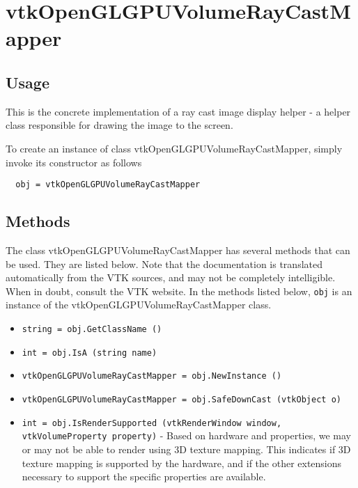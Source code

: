 \section{vtkOpenGLGPUVolumeRayCastMapper}

\subsection{Usage}

 This is the concrete implementation of a ray cast image display helper -
 a helper class responsible for drawing the image to the screen.

To create an instance of class vtkOpenGLGPUVolumeRayCastMapper, simply
invoke its constructor as follows
\begin{verbatim}
  obj = vtkOpenGLGPUVolumeRayCastMapper
\end{verbatim}
\subsection{Methods}

The class vtkOpenGLGPUVolumeRayCastMapper has several methods that can be used.
  They are listed below.
Note that the documentation is translated automatically from the VTK sources,
and may not be completely intelligible.  When in doubt, consult the VTK website.
In the methods listed below, \verb|obj| is an instance of the vtkOpenGLGPUVolumeRayCastMapper class.
\begin{itemize}
\item  \verb|string = obj.GetClassName ()|

\item  \verb|int = obj.IsA (string name)|

\item  \verb|vtkOpenGLGPUVolumeRayCastMapper = obj.NewInstance ()|

\item  \verb|vtkOpenGLGPUVolumeRayCastMapper = obj.SafeDownCast (vtkObject o)|

\item  \verb|int = obj.IsRenderSupported (vtkRenderWindow window, vtkVolumeProperty property)| -  Based on hardware and properties, we may or may not be able to
 render using 3D texture mapping. This indicates if 3D texture
 mapping is supported by the hardware, and if the other extensions
 necessary to support the specific properties are available.

\end{itemize}
